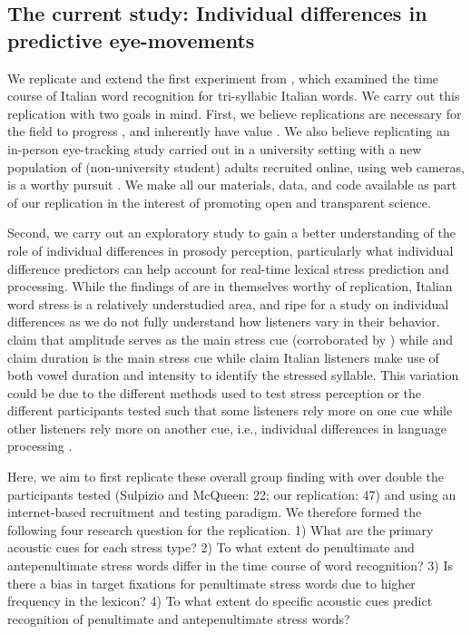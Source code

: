 \subsection{The current study: Individual differences in predictive eye-movements}

We replicate and extend the first experiment from \cite{Sulpizio_McQueen_2012}, which examined the time course of Italian word recognition for tri-syllabic Italian words. We carry out this replication with two goals in mind. First, we believe replications are necessary for the field to progress \citep{Rakosi2017}, and inherently have value \citep{Kobrock2023}. We also believe replicating an in-person eye-tracking study carried out in a university setting with a new population of (non-university student) adults recruited online, using web cameras, is a worthy pursuit \citep{Prystauka_Altmann_Rothman_2023}. We make all our materials, data, and code available as part of our replication in the interest of promoting open and transparent science.

Second, we carry out an exploratory study to gain a better understanding of the role of individual differences in prosody perception, particularly what individual difference predictors can help account for real-time lexical stress prediction and processing. While the findings of \cite{Sulpizio_McQueen_2012} are in themselves worthy of replication, Italian word stress is a relatively understudied area, and ripe for a study on individual differences as we do not fully understand how listeners vary in their behavior.  \cite{Maturi1998} claim that amplitude serves as the main stress cue (corroborated by \cite{Sulpizio_McQueen_2012}) while \cite{Alfano2006} and \cite{Alfano2009} claim duration is the main stress cue while \cite{Tagliapietra2005} claim Italian listeners make use of both vowel duration and intensity to identify the stressed syllable. This variation could be due to the different methods used to test stress perception or the different participants tested such that some listeners rely more on one cue while other listeners rely more on another cue, i.e., individual differences in language processing \citep{Yu2019,Kidd2018}.

Here, we aim to first replicate these overall group finding with over double the participants tested (Sulpizio and McQueen: 22; our replication: 47) and using an internet-based recruitment and testing paradigm. We therefore formed the following four research question for the replication. 1) What are the primary acoustic cues for each stress type? 2) To what extent do penultimate and antepenultimate stress words differ in the time course of word recognition? 3) Is there a bias in target fixations for penultimate stress words due to higher frequency in the lexicon? 4) To what extent do specific acoustic cues predict recognition of penultimate and antepenultimate stress words? 

